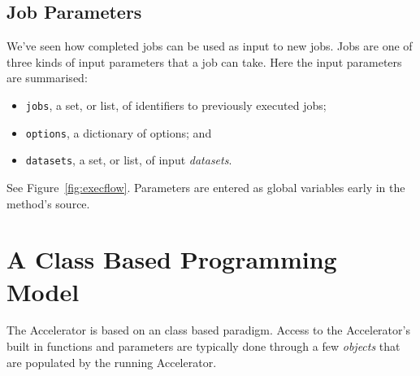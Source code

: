 \clearpage
\subsection{Job Parameters}
\label{sec:jobparams}
We've seen how completed jobs can be used as input to new
jobs.  Jobs are one of three kinds of input parameters that
a job can take.  Here the input parameters are summarised:
\begin{itemize}
\item[] \texttt{jobs}, a set, or list, of identifiers to previously executed jobs;
\item[] \texttt{options}, a dictionary of options; and
\item[] \texttt{datasets}, a set, or list, of input \textsl{datasets}.
\end{itemize}
See Figure~\ref{fig:execflow}.  Parameters are entered as global
variables early in the method's source.


\section{A Class Based Programming Model}
The Accelerator is based on an class based paradigm. Access to the
Accelerator's built in functions and parameters are typically done
through a few \textsl{objects} that are populated by the running
Accelerator.
